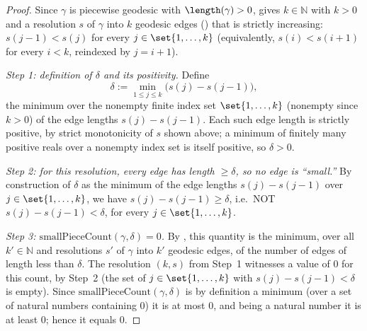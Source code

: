 \begin{proof}
  Since $\gamma$ is piecewise geodesic with $\length(\gamma) > 0$, 
  gives $k \in \mathbb{N}$ with $k > 0$ and a resolution $s$ of $\gamma$ into $k$ geodesic edges
  () that is strictly increasing: $s(j-1) < s(j)$ for every $j \in
  \set{1,\dots,k}$ (equivalently, $s(i) < s(i+1)$ for every $i < k$, reindexed by $j = i+1$).

  \emph{Step 1: definition of $\delta$ and its positivity.} Define
  \[
    \delta := \min_{1 \le j \le k} \bigl(s(j) - s(j-1)\bigr)
    ,
  \]
  the minimum over the nonempty finite index set $\set{1,\dots,k}$ (nonempty since $k>0$) of the
  edge lengths $s(j)-s(j-1)$. Each such edge length is strictly positive, by strict monotonicity of
  $s$ shown above; a minimum of finitely many positive reals over a nonempty index set is itself
  positive, so $\delta > 0$.

  \emph{Step 2: for this resolution, every edge has length $\ge \delta$, so no edge is ``small.''}
  By construction of $\delta$ as the minimum of the edge lengths $s(j)-s(j-1)$ over $j \in
  \set{1,\dots,k}$, we have $s(j) - s(j-1) \ge \delta$, i.e.\ NOT $s(j)-s(j-1) < \delta$, for every
  $j \in \set{1,\dots,k}$.

  \emph{Step 3: $\mathrm{smallPieceCount}(\gamma,\delta) = 0$.} By , this
  quantity is the minimum, over all $k' \in \mathbb{N}$ and resolutions $s'$ of $\gamma$ into $k'$
  geodesic edges, of the number of edges of length less than $\delta$. The resolution $(k,s)$ from
  Step~1 witnesses a value of $0$ for this count, by Step~2 (the set of $j \in \set{1,\dots,k}$ with
  $s(j)-s(j-1) < \delta$ is empty). Since $\mathrm{smallPieceCount}(\gamma,\delta)$ is by definition
  a minimum (over a set of natural numbers containing $0$) it is at most $0$, and being a natural
  number it is at least $0$; hence it equals $0$.


\end{proof}
